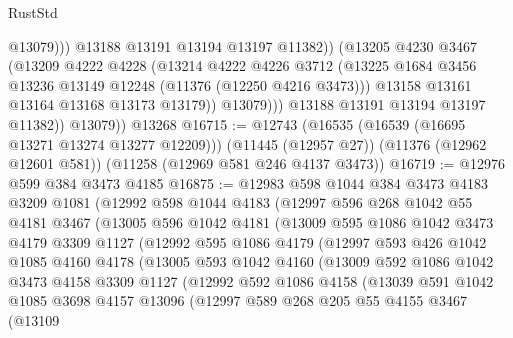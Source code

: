 \begin{lexlean}{RustStd}
\begin{coremodule}
{{{{{{{{{{{{{{{{{{{                          @13079)))
                    @13188
                    @13191
                    @13194
                    @13197
                    @11382))
                (@13205
                  @4230
                  @3467
                  (@13209
                    @4222
                    @4228
                    (@13214
                      @4222
                      @4226
                      @3712
                      (@13225 @1684 @3456 @13236 @13149 @12248 (@11376 (@12250 @4216 @3473)))
                      @13158
                      @13161
                      @13164
                      @13168
                      @13173
                      @13179))
                  @13079)))
            @13188
            @13191
            @13194
            @13197
            @11382))
        @13079))
    @13268
@16715 := @12743
    (@16535 (@16539 (@16695 @13271 @13274 @13277 @12209)))
    (@11445 (@12957 @27))
    (@11376 (@12962 @12601 @581))
    (@11258 (@12969 @581 @246 @4137 @3473))
@16719 := @12976 @599 @384 @3473 @4185
@16875 := @12983
    @598
    @1044
    @384
    @3473
    @4183
    @3209
    @1081
    (@12992
      @598
      @1044
      @4183
      (@12997
        @596
        @268
        @1042
        @55
        @4181
        @3467
        (@13005
          @596
          @1042
          @4181
          (@13009
            @595
            @1086
            @1042
            @3473
            @4179
            @3309
            @1127
            (@12992
              @595
              @1086
              @4179
              (@12997
                @593
                @426
                @1042
                @1085
                @4160
                @4178
                (@13005
                  @593
                  @1042
                  @4160
                  (@13009
                    @592
                    @1086
                    @1042
                    @3473
                    @4158
                    @3309
                    @1127
                    (@12992
                      @592
                      @1086
                      @4158
                      (@13039
                        @591
                        @1042
                        @1085
                        @3698
                        @4157
                        @13096
                        (@12997
                          @589
                          @268
                          @205
                          @55
                          @4155
                          @3467
                          (@13109
}}}}}}}}}}}}}}}}}}}
\end{coremodule}
\end{lexlean}

